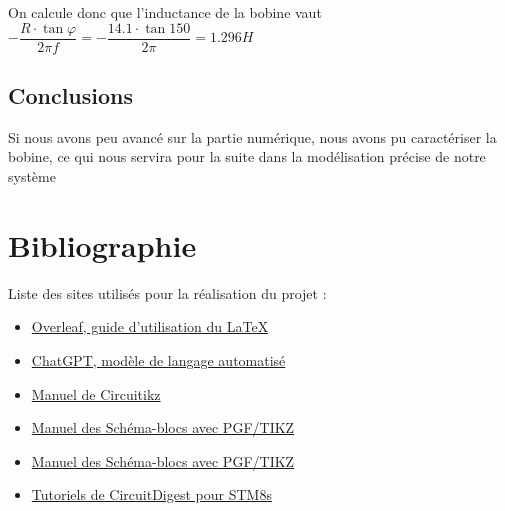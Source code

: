 \documentclass[11pt,a4paper]{article}
\begin{document}
On calcule donc que l'inductance de la bobine vaut $-\dfrac{R\cdot \tan \varphi}{2\pi f} = -\dfrac{14.1\cdot \tan 150}{2\pi}\boxed{=1.296H}$

\subsection{Conclusions}
Si nous avons peu avancé sur la partie numérique, nous avons pu caractériser la bobine, ce qui nous servira pour la suite dans la modélisation précise de notre système

\pagebreak
\section{Bibliographie}
Liste des sites utilisés pour la réalisation du projet :
\begin{itemize}
\item \href{https://www.overleaf.com/learn}{Overleaf, guide d'utilisation du \LaTeX{}}
\item \href{https://chat.openai.com/chat}{ChatGPT, modèle de langage automatisé}
\item \href{https://ctan.mines-albi.fr/graphics/pgf/contrib/circuitikz/doc/circuitikzmanual.pdf}{Manuel de Circuitikz}
\item \href{https://sciences-indus-cpge.papanicola.info/IMG/pdf/schemabloc.pdf}{Manuel des Schéma-blocs avec PGF/TIKZ}
\item \href{https://sciences-indus-cpge.papanicola.info/IMG/pdf/schemabloc.pdf}{Manuel des Schéma-blocs avec PGF/TIKZ}
\item \href{https://circuitdigest.com/microcontroller-projects/getting-started-with-stm8s-using-stvd-and-cosmic-c-compiler}{Tutoriels de CircuitDigest pour STM8s}
\end{itemize}
\end{document}

